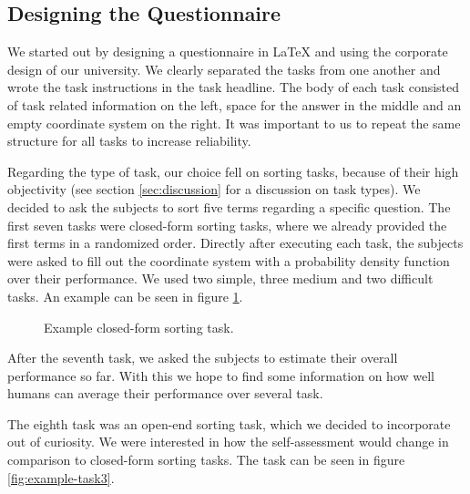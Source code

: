 \documentclass[../main/main.tex]{subfiles}
\begin{document}
	
	
	\subsection{Designing the Questionnaire}
	
	We started out by designing a questionnaire in LaTeX \cite{lamport1994latex} and using the corporate design of our university. We clearly separated the tasks from one another and wrote the task instructions in the task headline. The body of each task consisted of task related information on the left, space for the answer in the middle and an empty coordinate system on the right. It was important to us to repeat the same structure for all tasks to increase reliability.
	
	Regarding the type of task, our choice fell on sorting tasks, because of their high objectivity (see section \ref{sec:discussion} for a discussion on task types). We decided to ask the subjects to sort five terms regarding a specific question. The first seven tasks were closed-form sorting tasks, where we already provided the first terms in a randomized order. Directly after executing each task, the subjects were asked to fill out the coordinate system with a probability density function over their performance. We used two simple, three medium and two difficult tasks. An example can be seen in figure \ref{fig:example-task}.
	
	\begin{figure}[h]
		\centering
		\captionsetup{justification=centering}
		\caption{Example closed-form sorting task.}
		\label{fig:example-task}
	\end{figure} 
	
	\noindent After the seventh task, we asked the subjects to estimate their overall performance so far. With this we hope to find some information on how well humans can average their performance over several task. 
		
	 The eighth task was an open-end sorting task, which we decided to incorporate out of curiosity. We were interested in how the self-assessment would change in comparison to closed-form sorting tasks. The task can be seen in figure \ref{fig:example-task3}.
	 
\end{document}

